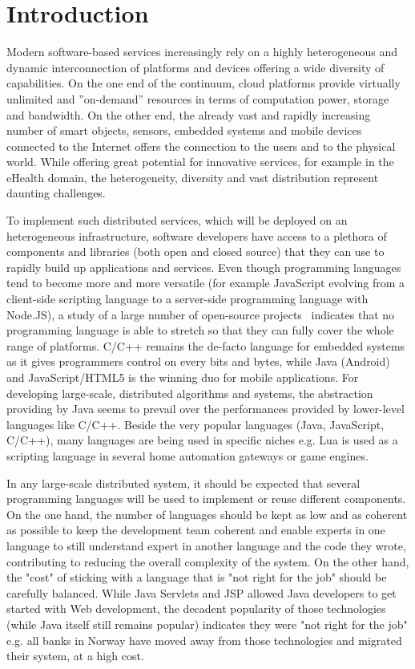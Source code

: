 \section{Introduction}

Modern software-based services increasingly rely on a highly heterogeneous and dynamic interconnection of platforms and devices offering a wide diversity of capabilities. On the one end of the continuum, cloud platforms provide virtually unlimited and ”on-demand” resources in terms of computation power, storage and bandwidth. On the other end, the already vast and rapidly increasing number of smart objects, sensors, embedded systems and mobile devices connected to the Internet offers the connection to the users and to the physical world. While offering great potential for innovative services, for example in the eHealth domain, the heterogeneity, diversity and vast distribution represent daunting challenges. 

To implement such distributed services, which will be deployed on an heterogeneous infrastructure, software developers have access to a plethora of components and libraries (both open and closed source) that they can use to rapidly build up applications and services. Even though programming languages tend to become more and more versatile (for example JavaScript evolving from a client-side scripting language to a server-side programming language with Node.JS), a study of a large number of open-source projects~\cite{DBLP:conf/icse/MorinFB15} indicates that no programming language is able to stretch so that they can fully cover the whole range of platforms. C/C++ remains the de-facto language for embedded systems as it gives programmers control on every bits and bytes, while Java (Android) and JavaScript/HTML5 is the winning duo for mobile applications. For developing large-scale, distributed algorithms and systems, the abstraction providing by Java seems to prevail over the performances provided by lower-level languages like C/C++. Beside the very popular languages (Java, JavaScript, C/C++), many languages are being used in specific niches e.g. Lua is used as a scripting language in several home automation gateways or game engines. 

In any large-scale distributed system, it should be expected that several programming languages will be used to implement or reuse different components. On the one hand, the number of languages should be kept as low and as coherent as possible to keep the development team coherent and enable experts in one language to still understand expert in another language and the code they wrote, contributing to reducing the overall complexity of the system. On the other hand, the "cost" of sticking with a language that is "not right for the job" should be carefully balanced. While Java Servlets and JSP allowed Java developers to get started with Web development, the decadent popularity of those technologies (while Java itself still remains popular) indicates they were "not right for the job" e.g. all banks in Norway have moved away from those technologies and migrated their system, at a high cost. 

